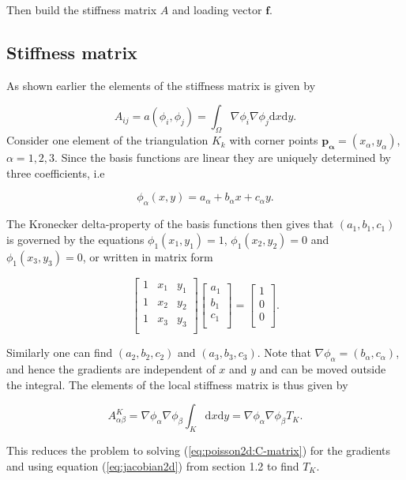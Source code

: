 \documentclass[paper=a4, fontsize=11pt]{scrartcl} %
\begin{document}
Then build the stiffness matrix $A$ and loading vector $\mathbf{f}$.

\subsection{Stiffness matrix}
As shown earlier the elements of the stiffness matrix is given by

\[ A_{ij} = a(\phi_i,\phi_j)=\int_{\Omega} \nabla \phi_i \nabla \phi_j \mathrm{d}x\mathrm{d}y.\] 
Consider one element of the triangulation $K_k$ with corner points $\mathbf{p_\alpha}=(x_\alpha,y_\alpha)$, $\alpha=1,2,3$. Since the basis functions are linear they are uniquely determined by three coefficients, i.e

\[\phi_\alpha(x,y) = a_\alpha +b_\alpha x+c_\alpha y.\]

The Kronecker delta-property of the basis functions then gives that $(a_1, b_1,c_1)$ is governed by the equations $\phi_1(x_1,y_1)=1$, $\phi_1(x_2,y_2)=0$ and $\phi_1(x_3,y_3)=0$, or written in matrix form

\begin{equation}
\begin{bmatrix}
  1 & x_1 & y_1\\
  1 & x_2 & y_2\\
  1 & x_3 & y_3\\\end{bmatrix}
\begin{bmatrix} a_1 \\ b_1\\ c_1 \\ \end{bmatrix} =
\begin{bmatrix}
  1 \\ 0\\ 0 \\
\end{bmatrix}.
\label{eq:poisson2d:C-matrix}
\end{equation}

Similarly one can find $(a_2, b_2,c_2)$ and $(a_3, b_3,c_3)$. Note that $\nabla \phi_\alpha=(b_\alpha,c_\alpha)$, and hence the gradients are independent of $x$ and $y$ and can be moved outside the integral. The elements of the local stiffness matrix is thus given by

\[ A^K_{\alpha\beta} =\nabla \phi_\alpha \nabla \phi_\beta \int_{K} \mathrm{d}x\mathrm{d}y = \nabla \phi_\alpha \nabla \phi_\beta T_K.\]

This reduces the problem to solving (\ref{eq:poisson2d:C-matrix}) for the gradients and using equation (\ref{eq:jacobian2d}) from section 1.2 to find $T_K$.
\end{document}
